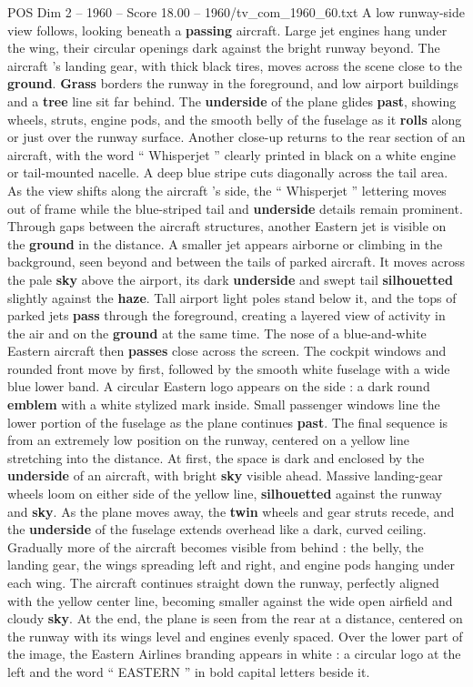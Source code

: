 \begin{textsample}{POS Dim 2 – 1960 – Score 18.00 – 1960/tv\_com\_1960\_60.txt}
A low runway-side view follows, looking beneath a \textbf{passing} aircraft.
Large jet engines hang under the wing, their circular openings dark against the bright runway beyond.
The aircraft ’s landing gear, with thick black tires, moves across the scene close to the \textbf{ground}. \textbf{Grass} borders the runway in the foreground, and low airport buildings and a \textbf{tree} line sit far behind.
The \textbf{underside} of the plane glides \textbf{past}, showing wheels, struts, engine pods, and the smooth belly of the fuselage as it \textbf{rolls} along or just over the runway surface.
Another close-up returns to the rear section of an aircraft, with the word “ Whisperjet ” clearly printed in black on a white engine or tail-mounted nacelle.
A deep blue stripe cuts diagonally across the tail area.
As the view shifts along the aircraft ’s side, the “ Whisperjet ” lettering moves out of frame while the blue-striped tail and \textbf{underside} details remain prominent.
Through gaps between the aircraft structures, another Eastern jet is visible on the \textbf{ground} in the distance.
A smaller jet appears airborne or climbing in the background, seen beyond and between the tails of parked aircraft.
It moves across the pale \textbf{sky} above the airport, its dark \textbf{underside} and swept tail \textbf{silhouetted} slightly against the \textbf{haze}.
Tall airport light poles stand below it, and the tops of parked jets \textbf{pass} through the foreground, creating a layered view of activity in the air and on the \textbf{ground} at the same time.
The nose of a blue-and-white Eastern aircraft then \textbf{passes} close across the screen.
The cockpit windows and rounded front move by first, followed by the smooth white fuselage with a wide blue lower band.
A circular Eastern logo appears on the side : a dark round \textbf{emblem} with a white stylized mark inside.
Small passenger windows line the lower portion of the fuselage as the plane continues \textbf{past}.
The final sequence is from an extremely low position on the runway, centered on a yellow line stretching into the distance.
At first, the space is dark and enclosed by the \textbf{underside} of an aircraft, with bright \textbf{sky} visible ahead.
Massive landing-gear wheels loom on either side of the yellow line, \textbf{silhouetted} against the runway and \textbf{sky}.
As the plane moves away, the \textbf{twin} wheels and gear struts recede, and the \textbf{underside} of the fuselage extends overhead like a dark, curved ceiling.
Gradually more of the aircraft becomes visible from behind : the belly, the landing gear, the wings spreading left and right, and engine pods hanging under each wing.
The aircraft continues straight down the runway, perfectly aligned with the yellow center line, becoming smaller against the wide open airfield and cloudy \textbf{sky}.
At the end, the plane is seen from the rear at a distance, centered on the runway with its wings level and engines evenly spaced.
Over the lower part of the image, the Eastern Airlines branding appears in white : a circular logo at the left and the word “ EASTERN ” in bold capital letters beside it.


\end{textsample}
